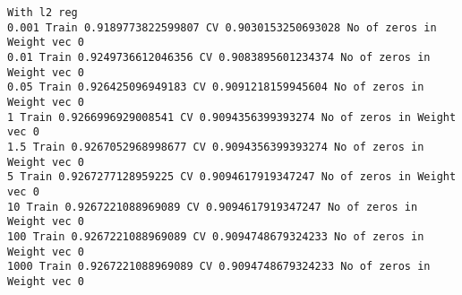 \documentclass[11pt]{article}
\begin{document}
    \begin{Verbatim}[commandchars=\\\{\}]
With l2 reg
0.001 Train 0.9189773822599807 CV 0.9030153250693028 No of zeros in Weight vec 0
0.01 Train 0.9249736612046356 CV 0.9083895601234374 No of zeros in Weight vec 0
0.05 Train 0.926425096949183 CV 0.9091218159945604 No of zeros in Weight vec 0
1 Train 0.9266996929008541 CV 0.9094356399393274 No of zeros in Weight vec 0
1.5 Train 0.9267052968998677 CV 0.9094356399393274 No of zeros in Weight vec 0
5 Train 0.9267277128959225 CV 0.9094617919347247 No of zeros in Weight vec 0
10 Train 0.9267221088969089 CV 0.9094617919347247 No of zeros in Weight vec 0
100 Train 0.9267221088969089 CV 0.9094748679324233 No of zeros in Weight vec 0
1000 Train 0.9267221088969089 CV 0.9094748679324233 No of zeros in Weight vec 0

    \end{Verbatim}
\end{document}
